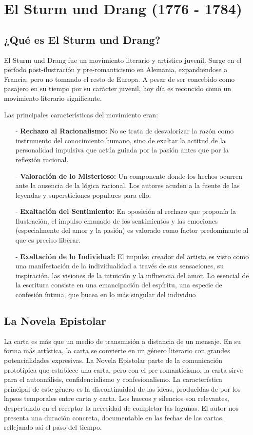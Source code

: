 \documentclass{article}
\begin{document}
\section{El Sturm und Drang (1776 - 1784)}

\subsection{¿Qué es El Sturm und Drang?}

El Sturm und Drang fue un movimiento literario y artístico juvenil. Surge en el período post-ilustración y pre-romanticismo en Alemania, expandiendose a Francia, pero no tomando el resto de Europa. A pesar de ser concebido como pasajero en su tiempo por su carácter juvenil, hoy día es reconcido como un movimiento literario significante.

Las principales características del movimiento eran:
\begin{itemize}
    \item[-] \textbf{Rechazo al Racionalismo:} No se trata de desvalorizar la razón como instrumento del conocimiento humano, sino de exaltar la actitud de la personalidad impulsiva que actúa guiada por la pasión antes que por la reflexión racional.
    \item[-] \textbf{Valoración de lo Misterioso:} Un componente donde los hechos ocurren ante la ausencia de la lógica racional. Los autores acuden a la fuente de las leyendas y supersticiones populares para ello.
    \item[-] \textbf{Exaltación del Sentimiento:} En oposición al
    rechazo que proponía la Ilustración, el impulso emanado de los sentimientos y las emociones (especialmente del amor y la pasión) es valorado como factor predominante al que es preciso liberar.
    \item[-]  \textbf{Exaltación de lo Individual:} El impulso creador del artista es visto como una manifestación de la individualidad a través de sus sensaciones, su inspiración, las visiones de la intuición y la influencia del amor. Lo esencial de la escritura consiste en una emancipación del espíritu, una especie de confesión íntima, que bucea en lo más singular del individuo
\end{itemize}

\subsection{La Novela Epistolar}

La carta es más que un medio de transmisión a distancia de un mensaje. En su forma más artística, la carta se convierte en un género literario con grandes potencialidades expresivas. La Novela Epistolar parte de la comunicación prototípica que establece una carta, pero con el pre-romanticismo, la carta sirve para el autoanálisis, confidencialismo y confesionalismo. La característica principal de este género es la discontinuidad de las ideas, producidas de por los lapsos temporales entre carta y carta. Los huecos y silencios son relevantes, despertando en el receptor la necesidad de completar las lagunas. El autor nos presenta una duración concreta, documentable en las fechas de las cartas, reflejando así el paso del tiempo.
\end{document}
